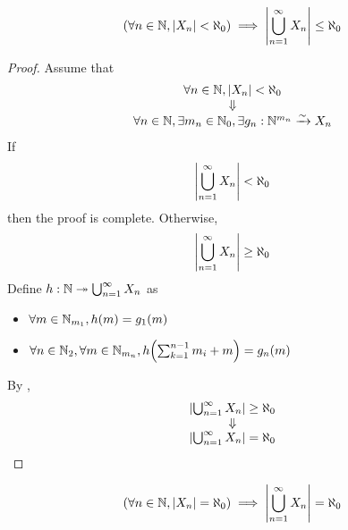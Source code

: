 \bigskip

\begin{theorem} \label{an:thm:countable-union-of-finite-sets-is-at-most-countable}
    \[
    \paren*{\forall n \in \N, \abs*{X_{n}} < \aleph_{0}} \implies \abs*{\bigcup_{n = 1}^{\infty} X_{n}} \leq \aleph_{0}
    \]
\end{theorem}

\begin{proof}
    Assume that
    \[
    \begin{array}{c}
        \forall n \in \N, \abs*{X_{n}} < \aleph_{0} \\
        \Downarrow \\
        \forall n \in \N, \exists m_{n} \in \N_{0}, \exists g_{n}: \N^{m_{n}} \xrightarrow{\sim} X_{n}
    \end{array}
    \]
    If
    \[
    \abs*{\bigcup_{n = 1}^{\infty} X_{n}} < \aleph_{0}
    \]
    then the proof is complete. Otherwise,
    \[
    \abs*{\bigcup_{n = 1}^{\infty} X_{n}} \geq \aleph_{0}
    \]
    Define $h: \N \twoheadrightarrow \bigcup_{n = 1}^{\infty} X_{n}$ as
    \begin{itemize}
        \item $\forall m \in \N_{m_{1}}, h(m) = g_{1}(m)$
        \item $\forall n \in \N_{2}, \forall m \in \N_{m_{n}}, h\paren*{\sum_{k = 1}^{n - 1} m_{i} + m} = g_{n}(m)$
    \end{itemize}
    By ,
    \[
    \begin{array}{c}
        \abs*{\bigcup_{n = 1}^{\infty} X_{n}} \geq \aleph_{0} \\
        \Downarrow \\
        \abs*{\bigcup_{n = 1}^{\infty} X_{n}} = \aleph_{0}
    \end{array}
    \]
\end{proof}

\bigskip

\begin{theorem} \label{an:thm:countable-union-of-countable-sets-is-countable}
    \[
    \paren*{\forall n \in \N, \abs*{X_{n}} = \aleph_{0}} \implies \abs*{\bigcup_{n = 1}^{\infty} X_{n}} = \aleph_{0}
    \]
\end{theorem}

